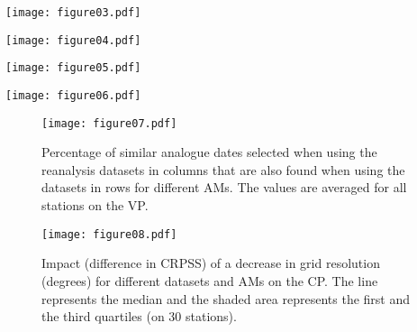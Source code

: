 \documentclass[smallextended]{svjour3}       %
\begin{document}
	\begin{figure*}
		\texttt{[image: figure03.pdf]}\\
		\caption{Impact of the reanalysis dataset on performance, isolated by processing the improvement in CRPSS for one dataset compared to the mean performance on all datasets, per station and per method. Note that the methods cannot be compared here, only the datasets. Same conventions as Fig. \ref{fig:comparison_values}.}
		\label{fig:comparison_relative}
	\end{figure*}
	
	\begin{figure*}
		\texttt{[image: figure04.pdf]}\\
		\caption{Inter-annual correlation between the mean precipitation from the selected analogues and the observations for all stations and for all considered AMs and reanalysis datasets on both the CP and the VP. Same conventions as Fig. \ref{fig:comparison_values}.}
		\label{fig:correlation}
	\end{figure*}
	
	\begin{figure*}
		\texttt{[image: figure05.pdf]}\\
		\caption{Same as Fig. \ref{fig:correlation}, but for relative biases.}
		\label{fig:biases}
	\end{figure*}
	
	\begin{figure*}
		\texttt{[image: figure06.pdf]}\\
		\caption{Best method per station for the different datasets. NR-2 and JRA-55C are not shown as they are similar to NR-1 and JRA-55 respectively. Background map: \textcopyright\ SwissTopo.}
		\label{fig:map_best_methods}
	\end{figure*}
	
	\begin{figure}
		\texttt{[image: figure07.pdf]}\\
		\caption{Percentage of similar analogue dates selected when using the reanalysis datasets in columns that are also found when using the datasets in rows for different AMs. The values are averaged for all stations on the VP.}
		\label{fig:similarities_analogue_dates}
	\end{figure}
	
	\begin{figure}
		\texttt{[image: figure08.pdf]}\\
		\caption{Impact (difference in CRPSS) of a decrease in grid resolution (degrees) for different datasets and AMs on the CP. The line represents the median and the shaded area represents the first and the third quartiles (on 30 stations).}
		\label{fig:plot_impact_resolution}
	\end{figure}
	
\end{document}
